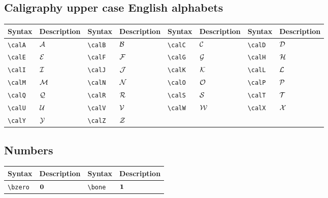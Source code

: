 \documentclass{article}
\begin{document}
	\subsection{Caligraphy upper case English alphabets}
	\begin{table}[H]
		\begin{tabular}{|l|l|l|l|l|l|l|l|}
			\hline
			Syntax	&	Description	&	Syntax	&	Description	&	Syntax	&	Description	&	Syntax	&	Description \\
			\hline
			\verb|\calA|	&	$\mathcal{A}$	&	\verb|\calB|	&	$\mathcal{B}$	&	\verb|\calC|	&	$\mathcal{C}$	&	\verb|\calD|	&	$\mathcal{D}$ \\
			\verb|\calE|	&	$\mathcal{E}$	&	\verb|\calF|	&	$\mathcal{F}$	&	\verb|\calG|	&	$\mathcal{G}$	&	\verb|\calH|	&	$\mathcal{H}$ \\
			\verb|\calI|	&	$\mathcal{I}$	&	\verb|\calJ|	&	$\mathcal{J}$	&	\verb|\calK|	&	$\mathcal{K}$	&	\verb|\calL|	&	$\mathcal{L}$ \\
			\verb|\calM|	&	$\mathcal{M}$	&	\verb|\calN|	&	$\mathcal{N}$	&	\verb|\calO|	&	$\mathcal{O}$	&	\verb|\calP|	&	$\mathcal{P}$ \\
			\verb|\calQ|	&	$\mathcal{Q}$	&	\verb|\calR|	&	$\mathcal{R}$	&	\verb|\calS|	&	$\mathcal{S}$	&	\verb|\calT|	&	$\mathcal{T}$ \\
			\verb|\calU|	&	$\mathcal{U}$	&	\verb|\calV|	&	$\mathcal{V}$	&	\verb|\calW|	&	$\mathcal{W}$	&	\verb|\calX|	&	$\mathcal{X}$ \\
			\verb|\calY|	&	$\mathcal{Y}$	&	\verb|\calZ|	&	$\mathcal{Z}$	&		&		&		&	 \\
			\hline	
		\end{tabular}
	\end{table}

	\subsection{Numbers}
	\begin{table}[H]
		\begin{tabular}{|l|l|l|l|}
			\hline
			Syntax	&	Description	&	Syntax	&	Description \\
			\hline
			\verb|\bzero|	&	$\boldsymbol{0}$	&	\verb|\bone|	&	$\boldsymbol{1}$ \\
			\hline	
		\end{tabular}
	\end{table}
\end{document}
